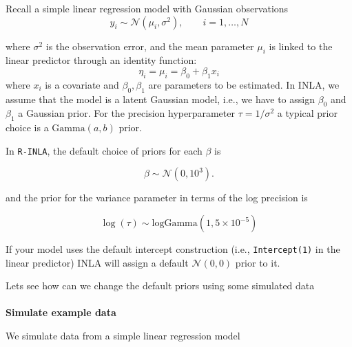 \documentclass[
  letterpaper,
  DIV=11,
  numbers=noendperiod]{scrartcl}
\makeatletter
\let\oldparagraph\paragraph
\renewcommand{\paragraph}{
    \@ifstar
      \xxxParagraphStar
      \xxxParagraphNoStar
  }
\newcommand{\xxxParagraphStar}[1]{\oldparagraph*{#1}\mbox{}}
\newcommand{\xxxParagraphNoStar}[1]{\oldparagraph{#1}\mbox{}}
\makeatother
\begin{document}
Recall a simple linear regression model with Gaussian observations \[
y_i\sim\mathcal{N}(\mu_i, \sigma^2), \qquad i = 1,\dots,N
\]

where \(\sigma^2\) is the observation error, and the mean parameter
\(\mu_i\) is linked to the linear predictor through an identity
function: \[
\eta_i = \mu_i = \beta_0 + \beta_1 x_i
\] where \(x_i\) is a covariate and \(\beta_0, \beta_1\) are parameters
to be estimated. In INLA, we assume that the model is a latent Gaussian
model, i.e., we have to assign \(\beta_0\) and \(\beta_1\) a Gaussian
prior. For the precision hyperparameter \(\tau = 1/\sigma^2\) a typical
prior choice is a \(\text{Gamma}(a,b)\) prior.

In \texttt{R-INLA}, the default choice of priors for each \(\beta\) is

\[
\beta \sim \mathcal{N}(0,10^3).
\]

and the prior for the variance parameter in terms of the log precision
is

\[ \log(\tau) \sim \mathrm{logGamma}(1,5 \times 10^{-5}) \]

\begin{tcolorbox}[enhanced jigsaw, titlerule=0mm, breakable, opacitybacktitle=0.6, rightrule=.15mm, left=2mm, arc=.35mm, toptitle=1mm, coltitle=black, colframe=quarto-callout-note-color-frame, opacityback=0, colback=white, bottomrule=.15mm, leftrule=.75mm, colbacktitle=quarto-callout-note-color!10!white, bottomtitle=1mm, title=\textcolor{quarto-callout-note-color}{\faInfo}\hspace{0.5em}{Note}, toprule=.15mm]

If your model uses the default intercept construction (i.e.,
\texttt{Intercept(1)} in the linear predictor) INLA will assign a
default \(\mathcal{N} (0,0)\) prior to it.

\end{tcolorbox}

Lets see how can we change the default priors using some simulated data

\paragraph{\texorpdfstring{\textbf{Simulate example
data}}{Simulate example data}}\label{simulate-example-data}

We simulate data from a simple linear regression model
\end{document}
